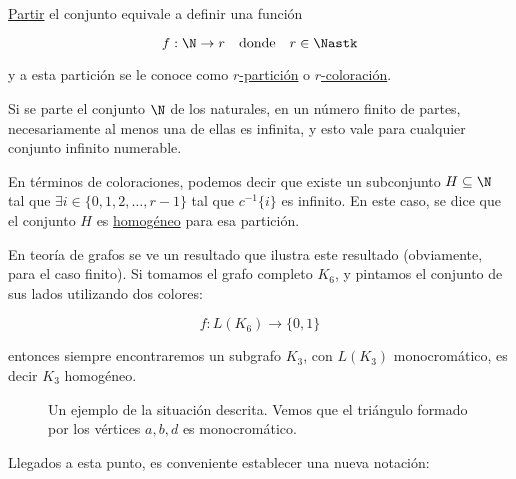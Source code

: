 \begin{defn}
    \ul{Partir} el conjunto equivale a definir una función
    
    \[
    f: \N \rightarrow r \quad \text{donde} \quad r \in \Nastk
    \]
    
    \noindent y a esta partición se le conoce como \ul{$r$-partición} o \ul{$r$-coloración}.
\end{defn}

\begin{teo}\label{teo:casillero}
    Si se parte el conjunto $\N$ de los naturales, en un número finito de partes, necesariamente al menos una de ellas es infinita, y esto vale para cualquier conjunto infinito numerable.
    
    En términos de coloraciones, podemos decir que existe un subconjunto $H \subseteq \N$ tal que $\exists i \in \{ 0, 1, 2, \dots, r-1 \}$ tal que $c^{-1}\{i\}$ es infinito. En este caso, se dice que el conjunto $H$ es \ul{homogéneo} para esa partición.
\end{teo}

\begin{ejem}
    En teoría de grafos se ve un resultado que ilustra este resultado (obviamente, para el caso finito). Si tomamos el grafo completo $K_6$, y pintamos el conjunto de sus lados utilizando dos colores:
    
    \[
    f: L(K_6) \rightarrow \{0, 1\}
    \]
    
    \noindent entonces siempre encontraremos un subgrafo $K_3$, con $L(K_3)$ monocromático, es decir $K_3$ homogéneo.
\end{ejem}


\begin{figure}
    \centering
    \caption{Un ejemplo de la situación descrita. Vemos que el triángulo formado por los vértices $a, b, d$ es monocromático.}
\end{figure}

Llegados a esta punto, es conveniente establecer una nueva notación:

